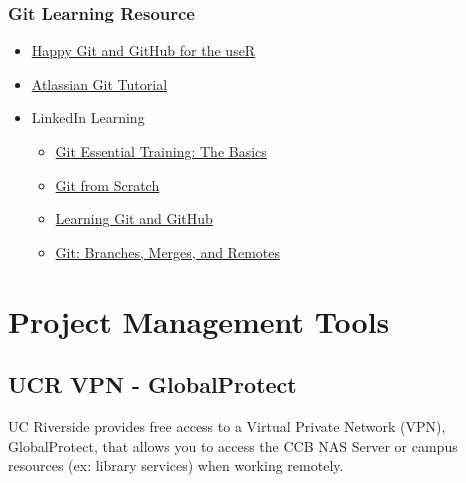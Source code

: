 \documentclass[
]{book}
\providecommand{\tightlist}{%
  \setlength{\itemsep}{0pt}\setlength{\parskip}{0pt}}
\begin{document}
\hypertarget{git-learning-resource}{%
\subsection{Git Learning Resource}\label{git-learning-resource}}

\begin{itemize}
\tightlist
\item
  \href{https://happygitwithr.com/index.html}{Happy Git and GitHub for the useR}
\item
  \href{https://www.atlassian.com/git/tutorials/learn-git-with-bitbucket-cloud}{Atlassian Git Tutorial}
\item
  LinkedIn Learning

  \begin{itemize}
  \tightlist
  \item
    \href{https://www.linkedin.com/learning/git-essential-training-the-basics/use-git-version-control-software-to-manage-project-code?autoplay=true\&u=26135898}{Git Essential Training: The Basics}
  \item
    \href{https://www.linkedin.com/learning/git-from-scratch/git-from-scratch?autoplay=true\&u=26135898}{Git from Scratch}
  \item
    \href{https://www.linkedin.com/learning/learning-git-and-github-14213624/travel-the-multiverse-with-git-and-github?autoplay=true\&u=26135898}{Learning Git and GitHub}
  \item
    \href{https://www.linkedin.com/learning/git-branches-merges-and-remotes/unlock-powerful-code-management-and-collaboration-tools-in-git?autoplay=true\&u=26135898}{Git: Branches, Merges, and Remotes}
  \end{itemize}
\end{itemize}

\hypertarget{projmgmt}{%
\chapter{Project Management Tools}\label{projmgmt}}

\hypertarget{ucr-vpn---globalprotect}{%
\section{UCR VPN - GlobalProtect}\label{ucr-vpn---globalprotect}}

UC Riverside provides free access to a Virtual Private Network (VPN), GlobalProtect, that allows you to access the CCB NAS Server or campus resources (ex: library services) when working remotely.
\end{document}
